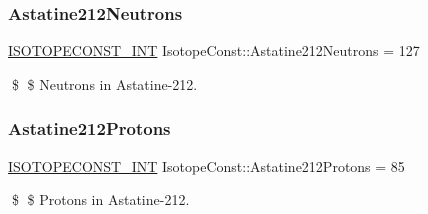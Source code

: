 \subsubsection{\texorpdfstring{Astatine212\+Neutrons}{Astatine212Neutrons}}
{\footnotesize\ttfamily \mbox{\hyperlink{group___isotope_const-_macros_ga5f18360b3e99483a35c32d789e62621c}{I\+S\+O\+T\+O\+P\+E\+C\+O\+N\+S\+T\+\_\+\+I\+NT}} Isotope\+Const\+::\+Astatine212\+Neutrons = 127}

\$ \$ Neutrons in Astatine-\/212. \mbox{\label{group___isotope_const-_astatine-_at212_ga1ae1e6468481020fd5b8f86b45213061}} 
\subsubsection{\texorpdfstring{Astatine212\+Protons}{Astatine212Protons}}
{\footnotesize\ttfamily \mbox{\hyperlink{group___isotope_const-_macros_ga5f18360b3e99483a35c32d789e62621c}{I\+S\+O\+T\+O\+P\+E\+C\+O\+N\+S\+T\+\_\+\+I\+NT}} Isotope\+Const\+::\+Astatine212\+Protons = 85}

\$ \$ Protons in Astatine-\/212. 
